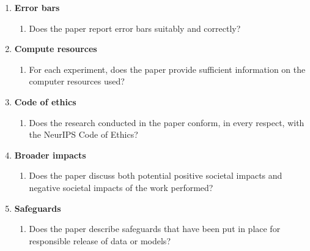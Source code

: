 \documentclass{article}
\begin{document}
\begin{enumerate}
\item {\bf Error bars}
    \begin{enumerate}
        \item Does the paper report error bars suitably and correctly?
    \end{enumerate}

\item {\bf Compute resources}
    \begin{enumerate}
        \item For each experiment, does the paper provide sufficient information on the computer resources used?
    \end{enumerate}

\item {\bf Code of ethics}
    \begin{enumerate}
        \item Does the research conducted in the paper conform, in every respect, with the NeurIPS Code of Ethics?
        \answerYes{}
    \end{enumerate}

\item {\bf Broader impacts}
    \begin{enumerate}
        \item Does the paper discuss both potential positive societal impacts and negative societal impacts of the work performed?
    \end{enumerate}

\item {\bf Safeguards}
    \begin{enumerate}
        \item Does the paper describe safeguards that have been put in place for responsible release of data or models?
    \end{enumerate}


\end{enumerate}
\end{document}
